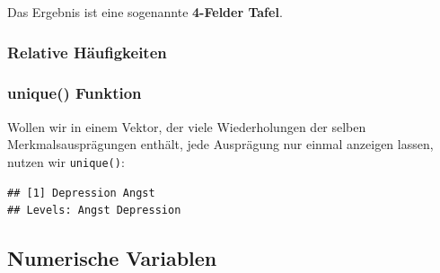 \documentclass[
]{book}
\newenvironment{Shaded}{\begin{snugshade}}{\end{snugshade}}
\newcommand{\FunctionTok}[1]{\textcolor[rgb]{0.00,0.00,0.00}{#1}}
\newcommand{\NormalTok}[1]{#1}
\newcommand{\SpecialCharTok}[1]{\textcolor[rgb]{0.00,0.00,0.00}{#1}}
\begin{document}
Das Ergebnis ist eine sogenannte \textbf{4-Felder Tafel}.

\hypertarget{relative-huxe4ufigkeiten}{%
\subsubsection{Relative Häufigkeiten}\label{relative-huxe4ufigkeiten}}

\hypertarget{unique-funktion}{%
\subsubsection{unique() Funktion}\label{unique-funktion}}

Wollen wir in einem Vektor, der viele Wiederholungen der selben Merkmalsausprägungen enthält, jede Ausprägung nur einmal anzeigen lassen, nutzen wir \texttt{unique()}:

\begin{Shaded}
\end{Shaded}

\begin{verbatim}
## [1] Depression Angst     
## Levels: Angst Depression
\end{verbatim}

\hypertarget{numerische-variablen}{%
\subsection{Numerische Variablen}\label{numerische-variablen}}
\end{document}
